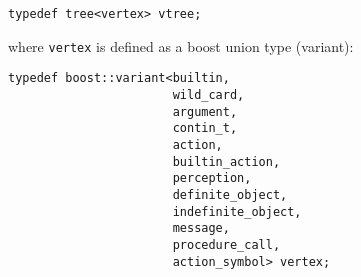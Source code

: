 \documentclass{article}
\begin{document}
  \begin{verbatim}
typedef tree<vertex> vtree;
  \end{verbatim}
  
  where \verb|vertex| is defined as a boost union type (variant):
  
  \begin{verbatim}
typedef boost::variant<builtin,
                       wild_card,
                       argument,
                       contin_t,
                       action,
                       builtin_action,
                       perception,
                       definite_object,
                       indefinite_object,
                       message,
                       procedure_call,
                       action_symbol> vertex;
  \end{verbatim}
\end{document}
